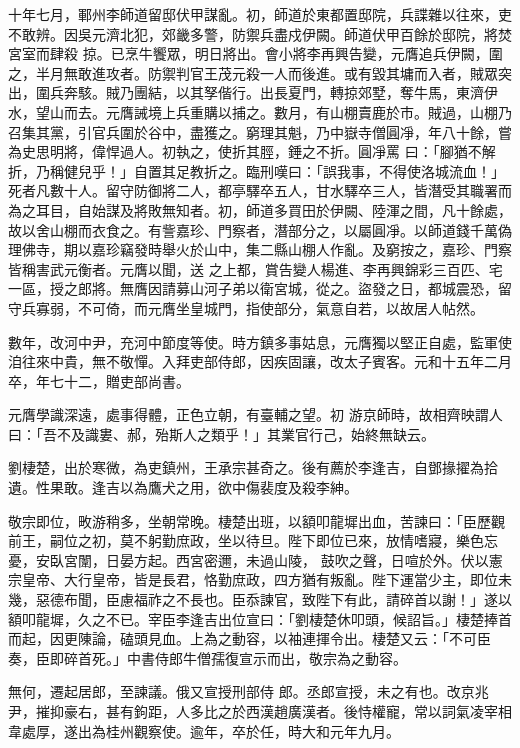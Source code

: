\begin{pinyinscope}
 十年七月，鄆州李師道留邸伏甲謀亂。初，師道於東都置邸院，兵諜雜以往來，吏不敢辨。因吳元濟北犯，郊畿多警，防禦兵盡戍伊闕。師道伏甲百餘於邸院，將焚宮室而肆殺
 掠。已烹牛饗眾，明日將出。會小將李再興告變，元膺追兵伊闕，圍之，半月無敢進攻者。防禦判官王茂元殺一人而後進。或有毀其墉而入者，賊眾突出，圍兵奔駭。賊乃團結，以其孥偕行。出長夏門，轉掠郊墅，奪牛馬，東濟伊水，望山而去。元膺誡境上兵重購以捕之。數月，有山棚賣鹿於市。賊過，山棚乃召集其黨，引官兵圍於谷中，盡獲之。窮理其魁，乃中嶽寺僧圓凈，年八十餘，嘗為史思明將，偉悍過人。初執之，使折其脛，錘之不折。圓凈罵
 曰：「腳猶不解折，乃稱健兒乎！」自置其足教折之。臨刑嘆曰：「誤我事，不得使洛城流血！」死者凡數十人。留守防御將二人，都亭驛卒五人，甘水驛卒三人，皆潛受其職署而為之耳目，自始謀及將敗無知者。初，師道多買田於伊闕、陸渾之間，凡十餘處，故以舍山棚而衣食之。有訾嘉珍、門察者，潛部分之，以屬圓凈。以師道錢千萬偽理佛寺，期以嘉珍竊發時舉火於山中，集二縣山棚人作亂。及窮按之，嘉珍、門察皆稱害武元衡者。元膺以聞，送
 之上都，賞告變人楊進、李再興錦彩三百匹、宅一區，授之郎將。無膺因請募山河子弟以衛宮城，從之。盜發之日，都城震恐，留守兵寡弱，不可倚，而元膺坐皇城門，指使部分，氣意自若，以故居人帖然。



 數年，改河中尹，充河中節度等使。時方鎮多事姑息，元膺獨以堅正自處，監軍使洎往來中貴，無不敬憚。入拜吏部侍郎，因疾固讓，改太子賓客。元和十五年二月卒，年七十二，贈吏部尚書。



 元膺學識深遠，處事得體，正色立朝，有臺輔之望。初
 游京師時，故相齊映謂人曰：「吾不及識婁、郝，殆斯人之類乎！」其業官行己，始終無缺云。



 劉棲楚，出於寒微，為吏鎮州，王承宗甚奇之。後有薦於李逢吉，自鄧掾擢為拾遺。性果敢。逢吉以為鷹犬之用，欲中傷裴度及殺李紳。



 敬宗即位，畋游稍多，坐朝常晚。棲楚出班，以額叩龍墀出血，苦諫曰：「臣歷觀前王，嗣位之初，莫不躬勤庶政，坐以待旦。陛下即位已來，放情嗜寢，樂色忘憂，安臥宮闈，日晏方起。西宮密邇，未過山陵，
 鼓吹之聲，日喧於外。伏以憲宗皇帝、大行皇帝，皆是長君，恪勤庶政，四方猶有叛亂。陛下運當少主，即位未幾，惡德布聞，臣慮福祚之不長也。臣忝諫官，致陛下有此，請碎首以謝！」遂以額叩龍墀，久之不已。宰臣李逢吉出位宣曰：「劉棲楚休叩頭，候詔旨。」棲楚捧首而起，因更陳論，磕頭見血。上為之動容，以袖連揮令出。棲楚又云：「不可臣奏，臣即碎首死。」中書侍郎牛僧孺復宣示而出，敬宗為之動容。



 無何，遷起居郎，至諫議。俄又宣授刑部侍
 郎。丞郎宣授，未之有也。改京兆尹，摧抑豪右，甚有鉤距，人多比之於西漢趙廣漢者。後恃權寵，常以詞氣凌宰相韋處厚，遂出為桂州觀察使。逾年，卒於任，時大和元年九月。




\end{pinyinscope}
